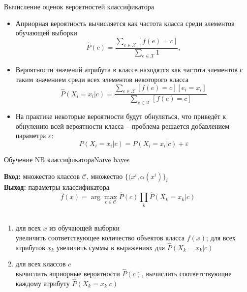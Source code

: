 \documentclass[compress,red,unicode]{beamer}
\begin{document}
\begin{frame}{Вычисление оценок вероятностей классификатора}
\begin{itemize}
	\item Априорная вероятность вычисляется как частота класса среди элементов обучающей выборки
$$
\hat P (c) = \frac{\sum_{e \in \mathcal{X}} [f(e) = c]}{\sum_{e \in \mathcal{X}} 1},
$$
	\item Вероятности значений атрибута в классе находятся как частота элементов с таким значением среди всех элементов некоторого класса
$$
\hat P (X_i = x_i | c) = \frac{\sum_{e \in \mathcal{X}} [f(e)=c][e_i = x_i]}{\sum_{e \in \mathcal{X}} [f(e) = c]}
$$
	\item На практике некоторые вероятности будут обнуляться, что приведёт к обнулению всей вероятности класса -- проблема решается добавлением параметра $\varepsilon$:
	$$
	P (X_i = x_i | c) = P (X_i = x_i | c) + \varepsilon
	$$
\end{itemize}
\end{frame}


\begin{frame}{Обучение NB классификатора}{Naïve bayes}
\begin{block}{}
\small
{\bf\color{main}Вход:} множество классов $\mathcal{C}$, множество $\{ (x^i, \alpha(x^i) \}_i$\\
{\bf\color{main}Выход:} параметры классификатора 
$$\hat f(x) = \arg \max_{c\in \mathcal{C}} \hat P (c) \prod_k  \hat P(X_k = x_k | c) $$\\[-12pt]
\footnotesize
\begin{enumerate}
\item для всех $x$ из обучающей выборки\\
{\footnotesize\color{main!40!black} увеличить соответствующее количество объектов класса $f(x)$; для всех атрибутов $x_k$ увеличить суммы в выражениях для $\hat P (X_k = x_k | c)$}
\item для всех классов $c$\\
{\footnotesize\color{main!40!black} вычислить априорные вероятности $\hat P(c)$, вычислить соответствующие каждому атрибуту $\hat P(X_k = x_k | c)$
}
\end{enumerate}
\end{block}
\end{frame}
\end{document}
